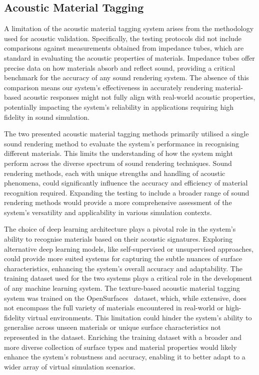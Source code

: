 \subsection{Acoustic Material Tagging}
A limitation of the acoustic material tagging system arises from the methodology used for acoustic validation. Specifically, the testing protocols did not include comparisons against measurements obtained from impedance tubes, which are standard in evaluating the acoustic properties of materials. Impedance tubes offer precise data on how materials absorb and reflect sound, providing a critical benchmark for the accuracy of any sound rendering system. The absence of this comparison means our system's effectiveness in accurately rendering material-based acoustic responses might not fully align with real-world acoustic properties, potentially impacting the system's reliability in applications requiring high fidelity in sound simulation.\par
The two presented acoustic material tagging methods primarily utilised a single sound rendering method to evaluate the system's performance in recognising different materials. This limits the understanding of how the system might perform across the diverse spectrum of sound rendering techniques. Sound rendering methods, each with unique strengths and handling of acoustic phenomena, could significantly influence the accuracy and efficiency of material recognition required. Expanding the testing to include a broader range of sound rendering methods would provide a more comprehensive assessment of the system's versatility and applicability in various simulation contexts.\par
The choice of deep learning architecture plays a pivotal role in the system's ability to recognise materials based on their acoustic signatures. Exploring alternative deep learning models, like self-supervised or unsupervised approaches, could provide more suited systems for capturing the subtle nuances of surface characteristics, enhancing the system's overall accuracy and adaptability. 
The training dataset used for the two systems plays a critical role in the development of any machine learning system. The texture-based acoustic material tagging system was trained on the OpenSurfaces~\citep{bell2013opensurfaces} dataset, which, while extensive, does not encompass the full variety of materials encountered in real-world or high-fidelity virtual environments. This limitation could hinder the system's ability to generalise across unseen materials or unique surface characteristics not represented in the dataset. Enriching the training dataset with a broader and more diverse collection of surface types and material properties would likely enhance the system's robustness and accuracy, enabling it to better adapt to a wider array of virtual simulation scenarios.

